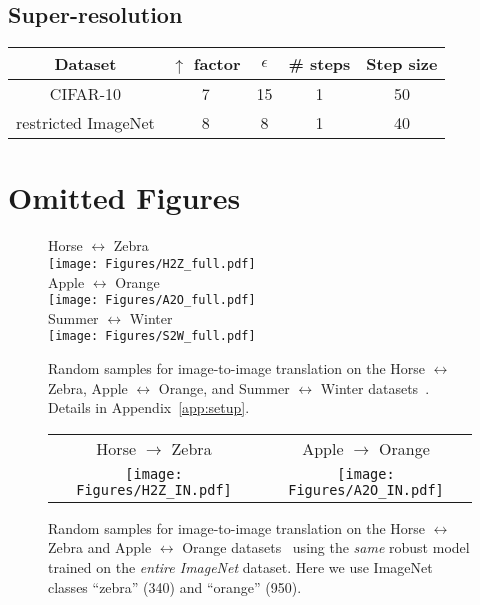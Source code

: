 \documentclass{article}
\newcommand{\HtoZ}{Horse $\leftrightarrow$ Zebra}
\newcommand{\StoW}{Summer $\leftrightarrow$ Winter}
\newcommand{\AtoO}{Apple $\leftrightarrow$ Orange}
\begin{document}
{\subsection{Super-resolution}

\begin{center}
	\setlength{\tabcolsep}{.8cm}
	\begin{tabular}{ccccc}
		\toprule 
		Dataset & $\uparrow$ factor & $\epsilon$ & \# steps & Step size \\
		\midrule
		CIFAR-10 & 7 & 15 & 1 & 50 \\
		restricted ImageNet & 8 & 8 & 1 & 40 \\
		\bottomrule 
	\end{tabular}
\end{center}
 \clearpage
\section{Omitted Figures}
\label{app:omitted}
\begin{figure}[!h]
\begin{center}
    {\HtoZ} \\[.2cm]
    \texttt{[image: Figures/H2Z\_full.pdf]} \\[.3cm]
    {\AtoO} \\[.2cm]
    \texttt{[image: Figures/A2O\_full.pdf]} \\[.3cm]
    {\StoW} \\[.2cm]
    \texttt{[image: Figures/S2W\_full.pdf]}
\end{center}
\caption{Random samples for image-to-image translation on the {\HtoZ}, {\AtoO},
    and {\StoW} datasets~\cite{zhu2017unpaired}. Details in
    Appendix~\ref{app:setup}.}
\label{fig:h2z_app}
\end{figure}

\begin{figure}[!h]
\begin{center}
    \setlength{\tabcolsep}{0.1cm}
    \begin{tabular}{cc}
        Horse $\to$ Zebra & Apple $\to$ Orange \\
        \texttt{[image: Figures/H2Z\_IN.pdf]} &
        \texttt{[image: Figures/A2O\_IN.pdf]} 
    \end{tabular}
\end{center}
\caption{Random samples for image-to-image translation on the {\HtoZ} and
    {\AtoO} datasets~\cite{zhu2017unpaired} using the {\em same} robust model
trained on the {\em entire ImageNet} dataset. Here we use ImageNet classes
``zebra'' (340) and ``orange'' (950).}
\label{fig:h2z_IN}
\end{figure}

}
\end{document}
